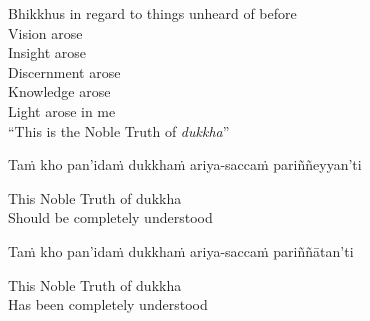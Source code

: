 \begin{english-verses}
  Bhikkhus in regard to things unheard of before\\
  Vision arose\\
  Insight arose\\
  Discernment arose\\
  Knowledge arose\\
  \ifbfive\enlargethispage{1\baselineskip}\fi
  Light arose in me\ifdigital\makeatletter\hyperlink{endnote55-appendix}\makeatother\fi \\
  ``This is the Noble Truth of \textit{dukkha}''
\end{english-verses}

\begin{pali-hang}
Taṁ kho pan'idaṁ dukkhaṁ ariya-saccaṁ pariññeyyan'ti
\end{pali-hang}

\begin{english}
  This Noble Truth of dukkha\ifdigital\makeatletter\hyperlink{endnote56-appendix}\makeatother\fi \\
  Should be completely understood
\end{english}

\begin{pali-hang}
Taṁ kho pan'idaṁ dukkhaṁ ariya-saccaṁ pariññātan'ti
\end{pali-hang}

\begin{english}
  This Noble Truth of dukkha\\
  Has been completely understood
\end{english}

